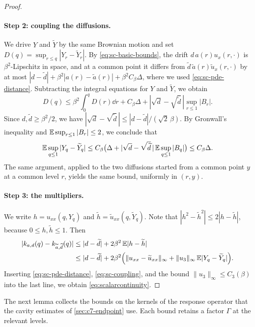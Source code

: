 \begin{proof}
\paragraph{Step 2: coupling the diffusions.}
We drive $Y$ and $\widetilde Y$ by the same Brownian motion and set
$D(q)=\sup_{r\le q}|Y_r-\widetilde Y_r|$. By
\eqref{eq:sc-basic-bounds}, the drift $d\,a(r)u_x(r,\cdot)$ is
$\beta^2$-Lipschitz in space, and at a common point it differs from
$\widetilde d\,\widetilde a(r)\widetilde u_x(r,\cdot)$ by at most
$|d-\widetilde d|+\beta^2|a(r)-\widetilde a(r)|+\beta^2C_\beta\Delta$,
where we used \eqref{eq:sc-pde-distance}. Subtracting the integral
equations for $Y$ and $\widetilde Y$, we obtain
\[
 D(q)\le\beta^2\int_0^qD(r)\dd r+C_\beta\Delta
 +|\sqrt d-\sqrt{\widetilde d}\,|\sup_{r\le1}|B_r| .
\]
Since $d,\widetilde d\ge\beta^2/2$, we have
$|\sqrt d-\sqrt{\widetilde d}\,|\le|d-\widetilde d|/(\sqrt2\,\beta)$.
By Gronwall's inequality and $\mathbb E\sup_{r\le1}|B_r|\le2$, we conclude
that
\begin{equation}\label{eq:sc-coupling}
 \mathbb E\sup_{q\le1}|Y_q-\widetilde Y_q|
 \le C_\beta\bigl(\Delta+|\sqrt d-\sqrt{\widetilde d}\,|\,
                     \mathbb E\sup_{q\le1}|B_q|\bigr)\le C_\beta\Delta .
\end{equation}
The same argument, applied to the two diffusions started from a common
point $y$ at a common level $r$, yields the same bound, uniformly in
$(r,y)$.

\paragraph{Step 3: the multipliers.}
We write $h=u_{xx}(q,Y_q)$ and $\widetilde h=\widetilde u_{xx}(q,\widetilde Y_q)$.
Note that $|h^2-\widetilde h^2|\le2|h-\widetilde h|$, because
$0\le h,\widetilde h\le1$. Then
\[
 \begin{aligned}
 |k_{a,d}(q)-k_{\widetilde a,\widetilde d}(q)|
 &\le|d-\widetilde d|+2\beta^2\,\mathbb E|h-\widetilde h|\\
 &\le|d-\widetilde d|+2\beta^2\Bigl(\|u_{xx}-\widetilde u_{xx}\|_\infty
   +\|u_3\|_\infty\,\mathbb E|Y_q-\widetilde Y_q|\Bigr).
 \end{aligned}
\]
Inserting \eqref{eq:sc-pde-distance}, \eqref{eq:sc-coupling}, and the
bound $\|u_3\|_\infty\le C_3(\beta)$ into the last line, we obtain
\eqref{eq:scalarcontinuity}.
\end{proof}

The next lemma collects the bounds on the kernels of the response
operator that the cavity estimates of \cref{sec:c7-endpoint} use. Each
bound retains a factor $\Gamma$ at the relevant levels.

